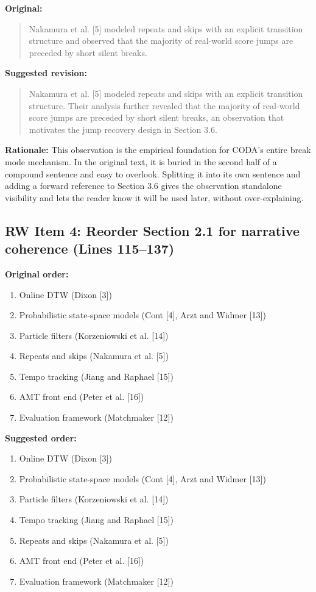\documentclass{article}
\begin{document}
\textbf{Original:}
\begin{quote}
Nakamura et al. [5] modeled repeats and skips with an explicit transition structure and observed that the majority of real-world score jumps are preceded by short silent breaks.
\end{quote}

\textbf{Suggested revision:}
\begin{quote}
Nakamura et al. [5] modeled repeats and skips with an explicit transition structure. Their analysis further revealed that the majority of real-world score jumps are preceded by short silent breaks, an observation that motivates the jump recovery design in Section 3.6.
\end{quote}

\textbf{Rationale:}
This observation is the empirical foundation for CODA's entire break mode mechanism. In the original text, it is buried in the second half of a compound sentence and easy to overlook. Splitting it into its own sentence and adding a forward reference to Section 3.6 gives the observation standalone visibility and lets the reader know it will be used later, without over-explaining.

\subsection*{RW Item 4: Reorder Section 2.1 for narrative coherence (Lines 115--137)}

\textbf{Original order:}
\begin{enumerate}
    \item Online DTW (Dixon [3])
    \item Probabilistic state-space models (Cont [4], Arzt and Widmer [13])
    \item Particle filters (Korzeniowski et al. [14])
    \item Repeats and skips (Nakamura et al. [5])
    \item Tempo tracking (Jiang and Raphael [15])
    \item AMT front end (Peter et al. [16])
    \item Evaluation framework (Matchmaker [12])
\end{enumerate}

\textbf{Suggested order:}
\begin{enumerate}
    \item Online DTW (Dixon [3])
    \item Probabilistic state-space models (Cont [4], Arzt and Widmer [13])
    \item Particle filters (Korzeniowski et al. [14])
    \item Tempo tracking (Jiang and Raphael [15])
    \item Repeats and skips (Nakamura et al. [5])
    \item AMT front end (Peter et al. [16])
    \item Evaluation framework (Matchmaker [12])
\end{enumerate}
\end{document}
